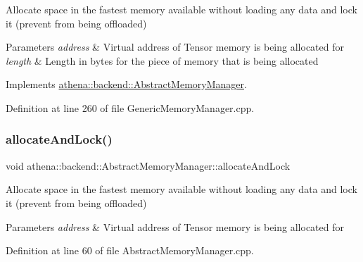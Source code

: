 Allocate space in the fastest memory available without loading any data and lock it (prevent from being offloaded) 
\begin{DoxyParams}{Parameters}
{\em address} & Virtual address of Tensor memory is being allocated for \\
\hline
{\em length} & Length in bytes for the piece of memory that is being allocated \\
\hline
\end{DoxyParams}


Implements \mbox{\hyperlink{classathena_1_1backend_1_1_abstract_memory_manager_a1b80008e94c21d5ac87f9a45d3f212a8}{athena\+::backend\+::\+Abstract\+Memory\+Manager}}.



Definition at line 260 of file Generic\+Memory\+Manager.\+cpp.

\mbox{\label{classathena_1_1backend_1_1generic_1_1_generic_memory_manager_ab5305b3d1ab91960bf179ce0be166120}} 
\subsubsection{\texorpdfstring{allocate\+And\+Lock()}{allocateAndLock()}\hspace{0.1cm}{\footnotesize\ttfamily [2/4]}}
{\footnotesize\ttfamily void athena\+::backend\+::\+Abstract\+Memory\+Manager\+::allocate\+And\+Lock}

Allocate space in the fastest memory available without loading any data and lock it (prevent from being offloaded) 
\begin{DoxyParams}{Parameters}
{\em address} & Virtual address of Tensor memory is being allocated for \\
\hline
\end{DoxyParams}


Definition at line 60 of file Abstract\+Memory\+Manager.\+cpp.

\mbox{\label{classathena_1_1backend_1_1generic_1_1_generic_memory_manager_a1b80008e94c21d5ac87f9a45d3f212a8}} 
